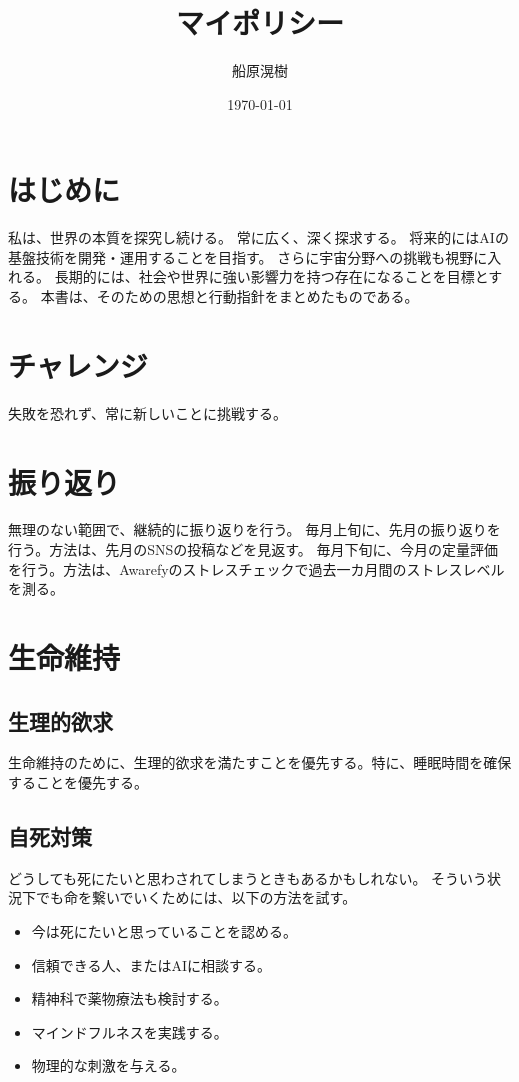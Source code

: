 \documentclass[dvipdfmx]{jlreq}
\title{マイポリシー}
\author{船原滉樹}
\date{\today}
\begin{document}
\maketitle

\section{はじめに}
    私は、世界の本質を探究し続ける。
    常に広く、深く探求する。
    将来的にはAIの基盤技術を開発・運用することを目指す。
    さらに宇宙分野への挑戦も視野に入れる。
    長期的には、社会や世界に強い影響力を持つ存在になることを目標とする。
    本書は、そのための思想と行動指針をまとめたものである。

\section{チャレンジ}
    失敗を恐れず、常に新しいことに挑戦する。

\section{振り返り}
    無理のない範囲で、継続的に振り返りを行う。
    毎月上旬に、先月の振り返りを行う。方法は、先月のSNSの投稿などを見返す。
    毎月下旬に、今月の定量評価を行う。方法は、Awarefyのストレスチェックで過去一カ月間のストレスレベルを測る。

\section{生命維持}
    \subsection{生理的欲求}
        生命維持のために、生理的欲求を満たすことを優先する。特に、睡眠時間を確保することを優先する。

    \subsection{自死対策}
        どうしても死にたいと思わされてしまうときもあるかもしれない。
        そういう状況下でも命を繋いでいくためには、以下の方法を試す。
        \begin{itemize}
            \item 今は死にたいと思っていることを認める。
            \item 信頼できる人、またはAIに相談する。
            \item 精神科で薬物療法も検討する。
            \item マインドフルネスを実践する。
            \item 物理的な刺激を与える。

        \end{itemize}
\end{document}
